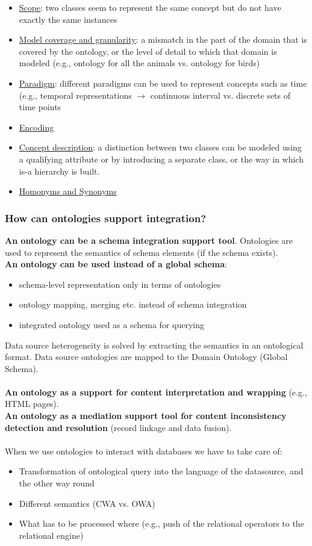 \documentclass[10pt,a4paper]{article}
\newcommand{\nline}{\\~\\}
\begin{document}
\begin{itemize}
	\item \uline{Scope}: two classes seem to represent the same concept but do not have exactly the same instances
	\item \uline{Model coverage and granularity}: a mismatch in the part of the domain that is covered by the ontology, or the level of detail to which that domain is modeled (e.g., ontology for all the animals vs. ontology for birds)
	\item \uline{Paradigm}: different paradigms can be used to represent concepts such as time (e.g., temporal representations $\rightarrow$ continuous interval vs. discrete sets of time points
	\item \uline{Encoding}
	\item \uline{Concept description}: a distinction between two classes can be modeled using a qualifying attribute or by introducing a separate class, or the way in which is-a hierarchy is built.
	\item \uline{Homonyms and Synonyms}
\end{itemize}
\pagebreak
\subsubsection{How can ontologies support integration?}
\textbf{An ontology can be a schema integration support tool}. Ontologies are used to represent the semantics of schema elements (if the schema exists). \\
\textbf{An ontology can be used instead of a global schema}:
\begin{itemize}
	\item schema-level representation only in terms of ontologies
	\item ontology mapping, merging etc. instead of schema integration
	\item integrated ontology used as a schema for querying
\end{itemize}
Data source heterogeneity is solved by extracting the semantics in an ontological format. Data source ontologies are mapped to the Domain Ontology (Global Schema). \nline
\textbf{An ontology as a support for content interpretation and wrapping} (e.g., HTML pages). \\ \textbf{An ontology as a mediation support tool for content inconsistency detection and resolution} (record linkage and data fusion).
\nline
When we use ontologies to interact with databases we have to take care of:
\begin{itemize}
	\item Transformation of ontological query into the language of the datasource, and the other way round
	\item Different semantics (CWA vs. OWA)
	\item What has to be processed where (e.g., push of the relational operators to the relational engine)
\end{itemize}
\pagebreak
\end{document}
